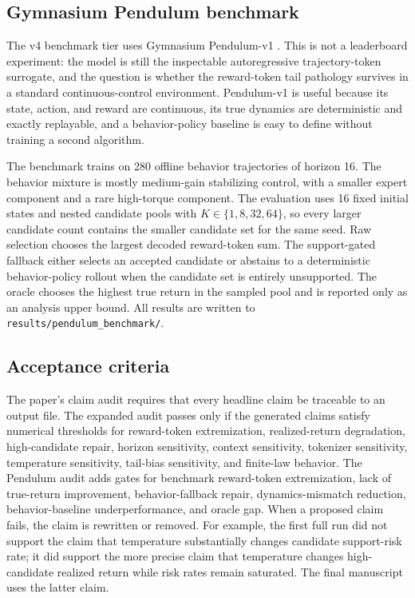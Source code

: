 \documentclass{article}
\begin{document}
\subsection{Gymnasium Pendulum benchmark}

The v4 benchmark tier uses Gymnasium Pendulum-v1 \citep{towers2024gymnasium}. This is not a leaderboard experiment: the model is still the inspectable autoregressive trajectory-token surrogate, and the question is whether the reward-token tail pathology survives in a standard continuous-control environment. Pendulum-v1 is useful because its state, action, and reward are continuous, its true dynamics are deterministic and exactly replayable, and a behavior-policy baseline is easy to define without training a second algorithm.

The benchmark trains on 280 offline behavior trajectories of horizon 16. The behavior mixture is mostly medium-gain stabilizing control, with a smaller expert component and a rare high-torque component. The evaluation uses 16 fixed initial states and nested candidate pools with \(K\in\{1,8,32,64\}\), so every larger candidate count contains the smaller candidate set for the same seed. Raw selection chooses the largest decoded reward-token sum. The support-gated fallback either selects an accepted candidate or abstains to a deterministic behavior-policy rollout when the candidate set is entirely unsupported. The oracle chooses the highest true return in the sampled pool and is reported only as an analysis upper bound. All results are written to \texttt{results/pendulum\_benchmark/}.

\subsection{Acceptance criteria}

The paper's claim audit requires that every headline claim be traceable to an output file. The expanded audit passes only if the generated claims satisfy numerical thresholds for reward-token extremization, realized-return degradation, high-candidate repair, horizon sensitivity, context sensitivity, tokenizer sensitivity, temperature sensitivity, tail-bias sensitivity, and finite-law behavior. The Pendulum audit adds gates for benchmark reward-token extremization, lack of true-return improvement, behavior-fallback repair, dynamics-mismatch reduction, behavior-baseline underperformance, and oracle gap. When a proposed claim fails, the claim is rewritten or removed. For example, the first full run did not support the claim that temperature substantially changes candidate support-risk rate; it did support the more precise claim that temperature changes high-candidate realized return while risk rates remain saturated. The final manuscript uses the latter claim.
\end{document}
